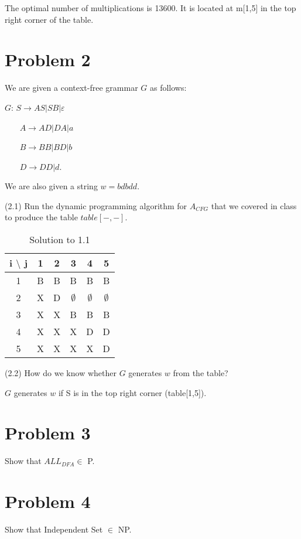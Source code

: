 \documentclass[11pt]{article}
\begin{document}
The optimal number of multiplications is 13600. It is located at m[1,5] in the top right corner of the table. 


\newpage
\section*{Problem 2}

\noindent
We are given a context-free grammar $G$ as follows:
\newline

$G$: $S\rightarrow AS|SB|\varepsilon$

~~~  $A\rightarrow AD|DA|a$

~~~  $B\rightarrow BB|BD|b$

~~~  $D\rightarrow DD|d$.

We are also given a string $w=bdbdd$.
\newline

\noindent
(2.1) Run the dynamic programming algorithm for $A_{CFG}$ that we covered in class to produce the table $table[-,-]$.


\begin{table}[H]
    \centering
    \begin{tabular}{c|c c c c c}
       i $\setminus$ j  & 1 & 2 & 3 & 4 & 5 \\
       \hline
       1 & B & B & B & B & B \\
       2 & X & D & $\emptyset$ & $\emptyset$ & $\emptyset$ \\
       3 & X & X & B & B & B \\
       4 & X & X & X & D & D\\
       5 & X & X & X & X & D \\
    \end{tabular}
    \caption{Solution to 1.1}
    \label{tab:1.1}
\end{table}

\noindent
(2.2) How do we know whether $G$ generates $w$ from the table?


$G$ generates $w$ if S is in the top right corner (table[1,5]).

\newpage
\section*{Problem 3}

Show that $ALL_{DFA}\in$ P.

\newpage
\section*{Problem 4}

Show that Independent Set $\in$ NP.
\newline
\end{document}
